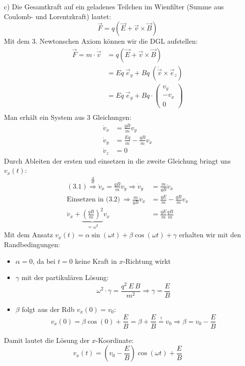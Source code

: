 \documentclass[11pt a4paper]{article}
\begin{document}
\vspace{0.5cm}

c) Die Gesamtkraft auf ein geladenes Teilchen im Wienfilter (Summe aus 
Coulomb- und Lorentzkraft) lautet:
\[
	\vec F = q (\vec E + \vec v \times \vec B)
\]
Mit dem 3. Newtonschen Axiom können wir die DGL aufstellen:
\begin{align*}
	\vec F = m \cdot \dot {\vec v} 
	&= q (\vec E + \vec v \times \vec B) \\
	&= Eq \ \vec e_y + Bq \ (\dot{\vec v} \times \vec e_z) \\
	&= Eq \ \vec e_y + Bq \cdot 
	\begin{pmatrix} v_y \\ -v_x \\ 0 \end{pmatrix} \\
\end{align*}
Man erhält ein System aus 3 Gleichungen:
\begin{align*}
	\dot v_x &= \frac{qB}{m} v_y \tag{3.1}\\
	\dot v_y &= \frac{Eq}{m} - \frac{qB}{m} v_x \tag{3.2}\\
	\dot v_z &= 0 \tag{3.3}
\end{align*}
Durch Ableiten der ersten und einsetzen in die zweite Gleichung bringt uns 
$v_x(t)$:
\begin{align*}
	(3.1) \overset{\frac{d}{dt}}{\Rightarrow}
	\ddot v_x = \frac{qB}{m} \dot v_y \Rightarrow
	\dot v_y &= \frac{m}{qB} \ddot v_x \\
	\text{Einsetzen in (3.2)} \ \Rightarrow
	\frac{m}{qB} \ddot v_x &=
	\frac{qE}{m} - \frac{qB}{m} v_x \\
	\ddot v_x + \underbrace{\left(\frac{qB}m \right)^2}_{= \omega^2}
	v_x
	&= \frac{qE}{m} \frac{qB}{m}
\end{align*}
Mit dem Ansatz $v_x(t) = \alpha \sin(\omega t) + \beta \cos(\omega t) + 
\gamma$ erhalten wir mit den Randbedingungen:
\begin{itemize}
	\item $\alpha = 0$, da bei $t=0$ keine Kraft in $x$-Richtung wirkt 
	\item $\gamma$ mit der partikulären Lösung:
	\[ 
		\omega^2 \cdot \gamma = \frac{q^2 \ E \ B}{m^2} 
		\Rightarrow
		\gamma = \frac EB
	\]
	\item $\beta$ folgt aus der Rdb $v_x(0) = v_0$:
	\[
		v_x(0) = \beta \cos(0) + \frac EB = \beta + \frac EB
		\overset{!}{=} v_0
		\Rightarrow
		\beta = v_0 - \frac{E}{B}
	\]
\end{itemize}
Damit lautet die Lösung der $x$-Koordinate:
\[ v_x (t) = \left( v_0 - \frac EB \right) \cos(\omega t) + \frac EB \]
\end{document}
